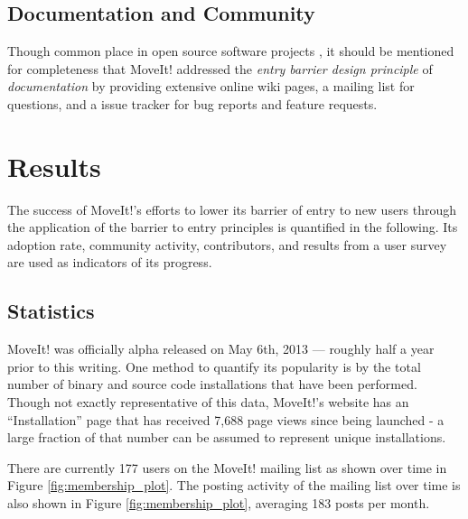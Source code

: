 \documentclass[10pt,journal,compsoc]{joser1}
\begin{document}
{%
\subsection{Documentation and Community}

Though common place in open source software projects \cite{bruyninckx2001open}, it should be mentioned for completeness that MoveIt! addressed the \textit{entry barrier design principle} of \textit{documentation} by providing extensive online wiki pages, a mailing list for questions, and a issue tracker for bug reports and feature requests.

\section{Results}
\label{sec::results}

The success of MoveIt!'s efforts to lower its barrier of entry to new users through the application of the barrier to entry principles is quantified in the following. Its adoption rate, community activity, contributors, and results from a user survey are used as indicators of its progress.

\subsection{Statistics}
\label{sec::statistics}

MoveIt! was officially alpha released on May 6th, 2013 --- roughly half a year prior to this writing. One method to quantify its popularity is by the total number of binary and source code installations that have been performed. Though not exactly representative of this data, MoveIt!'s website has an ``Installation'' page that has received 7,688 page views since being launched \cite{moveit} - a large fraction of that number can be assumed to represent unique installations. 

There are currently 177 users on the MoveIt! mailing list as shown over time in Figure \ref{fig:membership_plot}. The posting activity of the mailing list over time is also shown in Figure \ref{fig:membership_plot}, averaging 183 posts per month.

}
\end{document}
